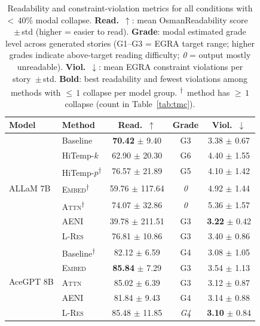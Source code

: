 \documentclass[11pt]{article}
\begin{document}
\begin{table}[t]
\centering
\small
\setlength{\tabcolsep}{5pt}
\renewcommand{\arraystretch}{1.15}
\caption{%
  Readability and constraint-violation metrics for all conditions with
  ${<}\,40\%$ modal collapse.
  \textbf{Read.}~$\uparrow$: mean OsmanReadability score \cite{el-haj-rayson-2016-osman}~$\pm$\,std
  (higher = easier to read).
  \textbf{Grade}: modal estimated grade level across generated stories
  (G1--G3 = EGRA target range; higher grades indicate above-target
  reading difficulty; \textit{0} = output mostly unreadable).
  \textbf{Viol.}~$\downarrow$: mean EGRA constraint violations per
  story~$\pm$\,std.
  \textbf{Bold}: best readability and fewest violations among methods
  with ${\leq}\,1$ collapse per model group.
  \textsuperscript{$\dagger$}~method has ${\geq}\,1$ collapse
  (count in Table~\ref{tab:tmc}).}
\label{tab:osman}
\begin{tabular}{l l c c c}
\toprule
\textbf{Model} & \textbf{Method}
  & \textbf{Read.}~$\uparrow$
  & \textbf{Grade}
  & \textbf{Viol.}~$\downarrow$ \\
\midrule
\multirow{7}{*}{ALLaM 7B}
  & Baseline
    & \textbf{70.42} $\pm$ 9.40  & G3 & 3.38 $\pm$ 0.67 \\
  & HiTemp-$k$
    & 62.90 $\pm$ 20.30 & G6 & 4.40 $\pm$ 1.55 \\
  & HiTemp-$p$\textsuperscript{$\dagger$}
    & 76.57 $\pm$ 21.89 & G5 & 4.10 $\pm$ 1.42 \\
  \cmidrule(l){2-5}
  & \textsc{Embed}\textsuperscript{$\dagger$}
    & 59.76 $\pm$ 117.64 & \textit{0} & 4.92 $\pm$ 1.44 \\
  & \textsc{Attn}\textsuperscript{$\dagger$}
    & 74.07 $\pm$ 32.86  & \textit{0} & 5.36 $\pm$ 1.57 \\
  & \textsc{AENI}
    & 39.78 $\pm$ 211.51 & G3 & \textbf{3.22} $\pm$ 0.42 \\
  & \textsc{L-Res}
    & 76.81 $\pm$ 10.86  & G3 & 3.40 $\pm$ 0.86 \\
\midrule
\multirow{5}{*}{AceGPT 8B}
  & Baseline\textsuperscript{$\dagger$}
    & 82.12 $\pm$ 6.59  & G4 & 3.08 $\pm$ 1.05 \\
  \cmidrule(l){2-5}
  & \textsc{Embed}
    & \textbf{85.84} $\pm$ 7.29  & G3 & 3.54 $\pm$ 1.13 \\
  & \textsc{Attn}
    & 85.02 $\pm$ 6.39  & G3 & {3.12} $\pm$ 0.87 \\
  & \textsc{AENI}
    & 81.84 $\pm$ 9.43  & G4 & 3.14 $\pm$ 0.88 \\
  & \textsc{L-Res}
    & 85.48 $\pm$ 11.85 & \textit{G4} & \textbf{3.10} $\pm$ 0.84 \\

\end{tabular}
\end{table}
\end{document}
